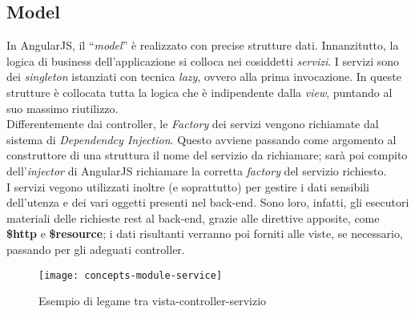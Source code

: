 \subsection{Model}
In AngularJS, il "`\emph{model}"' è realizzato con precise strutture dati. Innanzitutto, la logica di business dell'applicazione si colloca nei cosiddetti \emph{servizi}. I servizi sono dei \emph{singleton} istanziati con tecnica \emph{lazy}, ovvero alla prima invocazione. In queste strutture è collocata tutta la logica che è indipendente dalla \emph{view}, puntando al suo massimo riutilizzo.\\
Differentemente dai controller, le \emph{Factory} dei servizi vengono richiamate dal sistema di \emph{Dependendcy Injection}. Questo avviene passando come argomento al construttore di una struttura il nome del servizio da richiamare; sarà poi compito dell'\emph{injector} di AngularJS richiamare la corretta \emph{factory} del servizio richiesto.\\
I servizi vegono utilizzati inoltre (e soprattutto) per gestire i dati sensibili dell'utenza e dei vari oggetti presenti nel \gls{back-end}. Sono loro, infatti, gli esecutori materiali delle richieste \gls{rest} al \gls{back-end}, grazie alle direttive apposite, come \textbf{\$http} e \textbf{\$resource}; i dati risultanti verranno poi forniti alle viste, se necessario, passando per gli adeguati controller.

\begin{figure}[!h] 
    \centering 
    \texttt{[image: concepts-module-service]} 
    \caption{Esempio di legame tra vista-controller-servizio}
\end{figure}

